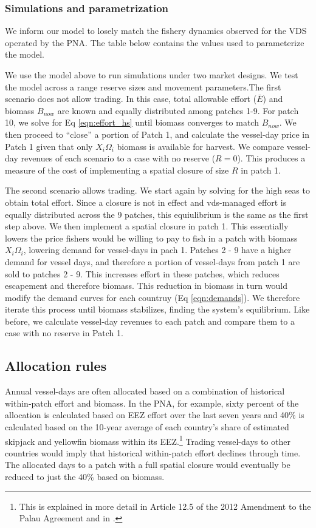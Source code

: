 \documentclass[12pt]{article}
\begin{document}
\subsubsection{Simulations and parametrization}

We inform our model to losely match the fishery dynamics observed for the VDS operated by the PNA. The table below contains the values used to parameterize the model.



We use the model above to run simulations under two market designs. We test the model across a range reserve sizes and movement parameters.The first scenario does not allow trading. In this case, total allowable effort ($\bar{E}$) and biomass $B_{now}$ are known and equally distributed among patches 1-9. For patch 10, we solve for Eq \ref{eqn:effort_hs} until biomass converges to match $B_{now}$. We then proceed to ``close'' a portion of Patch 1, and calculate the vessel-day price in Patch 1 given that only $X_i\Omega_i$ biomass is available for harvest. We compare vessel-day revenues of each scenario to a case with no reserve ($R = 0$). This produces a measure of the cost of implementing a spatial closure of size $R$ in patch 1.

The second scenario allows trading. We start again by solving for the high seas to obtain total effort. Since a closure is not in effect and vds-managed effort is equally distributed across the 9 patches, this equiulibrium is the same as the first step above. We then implement a spatial closure in patch 1. This essentially lowers the price fishers would be willing to pay to fish in a patch with biomass $X_i\Omega_i$, lowering demand for vessel-days in pach 1. Patches 2 - 9 have a higher demand for vessel days, and therefore a portion of vessel-days from patch 1 are sold to patches 2 - 9. This increases effort in these patches, which reduces escapement and therefore biomass. This reduction in biomass in turn would modify the demand curves for each countruy (Eq \ref{eqn:demands}). We therefore iterate this process until biomass stabilizes, finding the system's equilibrium. Like before, we calculate vessel-day revenues to each patch and compare them to a case with no reserve in Patch 1.

\subsection{Allocation rules}

Annual vessel-days are often allocated based on a combination of historical within-patch effort and biomass. In the PNA, for example, sixty percent of the allocation is calculated based on EEZ effort over the last seven years and 40\% is calculated based on the 10-year average of each country’s share of estimated skipjack and yellowfin biomass within its EEZ.\footnote{This is explained in more detail in Article 12.5 of the 2012 Amendment to the Palau Agreement and in \cite{Hagrannsoknir2014}.} Trading vessel-days to other countries would imply that historical within-patch effort declines through time. The allocated days to a patch with a full spatial closure would eventually be reduced to just the 40\% based on biomass.
\end{document}
